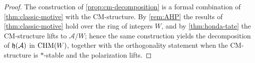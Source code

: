 \begin{proof}
  The construction of \cref{prop:cm-decomposition} is a formal combination of
  \cref{thm:classic-motive} with the CM-structure. By \cref{rem:AHP} the results
  of \cref{thm:classic-motive} hold over the ring of integers \(W\), and by
  \cref{thm:honda-tate} the CM-structure lifts to \(\mathcal{A}/W\); hence the
  same construction yields the decomposition of \(\mathfrak{h}(\mathcal{A})\) in
  \(\mathrm{CHM}(W)\), together with the orthogonality statement when the CM-structure is
  \(*\)-stable and the polarization lifts.
\end{proof}
